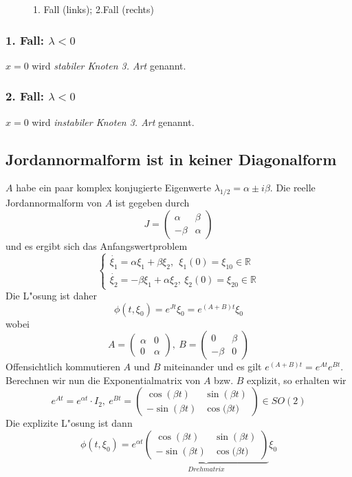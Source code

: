 \documentclass[a4paper, 13pt]{scrreprt}
\theoremstyle{definition} \newtheorem{definition}{Definition}[section]
\newcommand{\RR}{\mathbb{R}}
\begin{document}
\begin{figure}[htpb]
		\caption{1. Fall (links); 2.Fall (rechts)}
	\end{figure}
\subsubsection{1. Fall: $\lambda < 0$} 
$x = 0$ wird \emph{stabiler Knoten 3. Art} genannt.
\subsubsection{2. Fall: $\lambda < 0$}
$ x = 0 $ wird \emph{instabiler Knoten 3. Art} genannt.

\subsection{Jordannormalform ist in keiner Diagonalform} 
$A$ habe ein paar komplex konjugierte Eigenwerte $\lambda_{1/2} = \alpha \pm i \beta $. Die reelle Jordannormalform von $A$ ist gegeben durch
				$$ J = \left( \begin{array}{cc} \alpha & \beta \\ - \beta & \alpha \end{array}\right) $$ 
und es ergibt sich das Anfangswertproblem
		\[\begin{cases} 
			\dot{\xi_1} =  \alpha \xi_1 + \beta\xi_2, \ \  \xi_1(0) = \xi_{10} \in \RR \\
			\dot{\xi_2} = -\beta \xi_1 + \alpha \xi_2 , \ \xi_2(0) = \xi_{20} \in \RR
		\end{cases} \]
Die L"osung ist daher		
		\[ \phi(t,\xi_0) = e^{Jt} \xi_0 = e^{(A+B)t} \xi_0 \]
				wobei 
				$$ A = \left( \begin{array}{cc} \alpha & 0 \\ 0 & \alpha \end{array}\right), \ B = \left( \begin{array}{cc} 0 & \beta \\ - \beta & 0 \end{array}\right) $$
Offensichtlich kommutieren $A$ und $B$ miteinander und es gilt $ e^{(A+B)t} = e^{At} e^{Bt} $. Berechnen wir nun die Exponentialmatrix von $A$ bzw. $B$ explizit, so erhalten wir
				$$ e^{At} = e^{\alpha t} \cdot I_2, \  e^{Bt} = \left(\begin{array}{cc} \cos{(\beta t)}  & \sin{(\beta t)} \\ - \sin{(\beta t )} & \cos{(\beta t })  \end{array}\right) \in SO(2) $$
Die explizite L"osung ist dann
				\[\phi(t, \xi_0) = e^{\alpha t} \underbrace{\left(\begin{array}{cc} \cos{(\beta t)}  & \sin{(\beta t)} \\ - \sin{(\beta t )} & \cos{(\beta t })  \end{array}\right)}_{Drehmatrix} \xi_0
				\]
				
\end{document}
